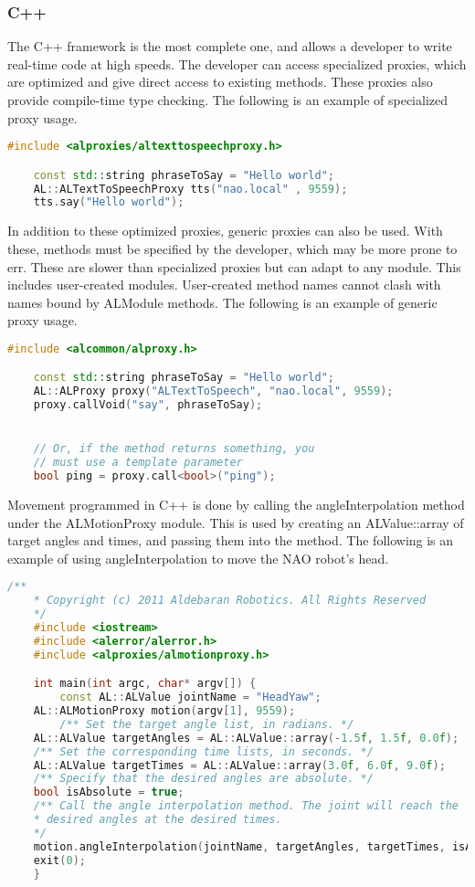 \subsubsection{C++}
The C++ framework is the most complete one, and allows a developer to write real-time code at high speeds.
The developer can access specialized proxies, which are optimized and give direct access to existing methods.
These proxies also provide compile-time type checking.
The following is an example of specialized proxy usage.

\begin{lstlisting}[language=C++]
	#include <alproxies/altexttospeechproxy.h>

	const std::string phraseToSay = "Hello world";
	AL::ALTextToSpeechProxy tts("nao.local" , 9559);
	tts.say("Hello world");
\end{lstlisting}

In addition to these optimized proxies, generic proxies can also be used.
With these, methods must be specified by the developer, which may be more prone to err.
These are slower than specialized proxies but can adapt to any module.
This includes user-created modules. User-created method names cannot clash with names bound by ALModule methods.
The following is an example of generic proxy usage. \cite{NAOSDK:C++}

\begin{lstlisting}[language=C++]
	#include <alcommon/alproxy.h>

	const std::string phraseToSay = "Hello world";
	AL::ALProxy proxy("ALTextToSpeech", "nao.local", 9559);
	proxy.callVoid("say", phraseToSay);


	// Or, if the method returns something, you
	// must use a template parameter
	bool ping = proxy.call<bool>("ping");
\end{lstlisting}

Movement programmed in C++ is done by calling the angleInterpolation method under the ALMotionProxy module.
This is used by creating an ALValue::array of target angles and times, and passing them into the method.
The following is an example of using angleInterpolation to move the NAO robot's head.
\begin{lstlisting}[language=C++]
	/**
	* Copyright (c) 2011 Aldebaran Robotics. All Rights Reserved
	*/
	#include <iostream>
	#include <alerror/alerror.h>
	#include <alproxies/almotionproxy.h>

	int main(int argc, char* argv[]) {
		const AL::ALValue jointName = "HeadYaw";
    AL::ALMotionProxy motion(argv[1], 9559);
	 	/** Set the target angle list, in radians. */
    AL::ALValue targetAngles = AL::ALValue::array(-1.5f, 1.5f, 0.0f);
    /** Set the corresponding time lists, in seconds. */
    AL::ALValue targetTimes = AL::ALValue::array(3.0f, 6.0f, 9.0f);
    /** Specify that the desired angles are absolute. */
    bool isAbsolute = true;
    /** Call the angle interpolation method. The joint will reach the
    * desired angles at the desired times.
    */
    motion.angleInterpolation(jointName, targetAngles, targetTimes, isAbsolute);
  	exit(0);
	}

\end{lstlisting}



